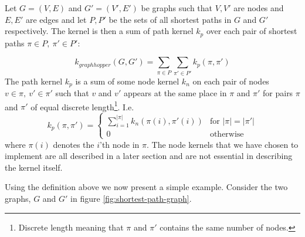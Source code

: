 \documentclass{article}
\begin{document}
Let $G=(V,E)$ and $G'=(V',E')$ be graphs such that $V,V'$ are nodes and $E,E'$ are edges and let $P,P'$ be the sets of all shortest paths in $G$ and $G'$ respectively. The kernel is then a sum of path kernel $k_p$ over each pair of shortest paths $\pi\in P,\ \pi'\in P'$:

\begin{equation}
\label{eq:k}
k_{graphhopper}(G,G')=\sum_{\pi\in P}\sum_{\pi'\in P'}k_p(\pi, \pi')
\end{equation}
The path kernel $k_p$ is a sum of some node kernel $k_n$ on each pair of nodes $v\in\pi,\ v'\in\pi'$ such that $v$ and $v'$ appears at the same place in $\pi$ and $\pi'$ for pairs $\pi$ and $\pi'$ of equal discrete length\footnote{Discrete length meaning that $\pi$ and $\pi'$ contains the same number of nodes.}. I.e.
\begin{equation}
\label{eq:k_p}
k_p(\pi, \pi')=\begin{cases}
\sum_{i=1}^{|\pi|}k_n(\pi(i), \pi'(i)) & \text{for }|\pi|=|\pi'|\\
0 & \text{otherwise}
\end{cases}
\end{equation}
where $\pi(i)$ denotes the $i$'th node in $\pi$. The node kernels that we have chosen to implement are all described in a later section and are not essential in describing the kernel itself.

Using the definition above we now present a simple example. Consider the two graphs, $G$ and $G'$ in figure \ref{fig:shortest-path-graph}.
\end{document}
